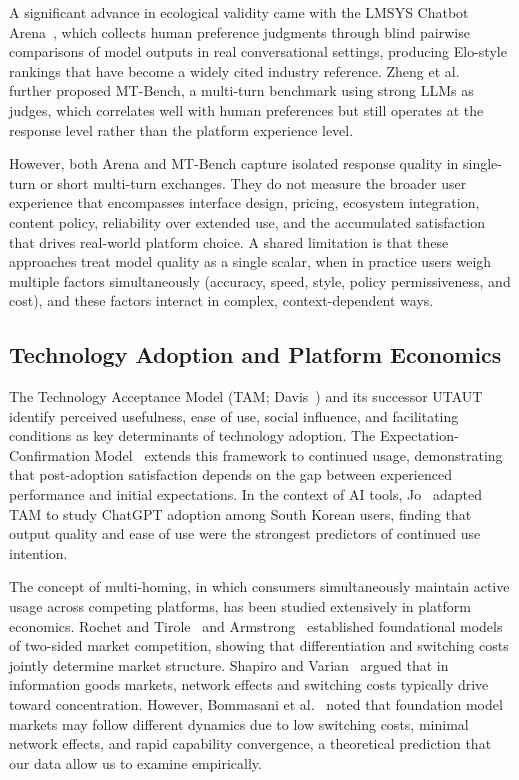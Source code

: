 \documentclass[10pt,twocolumn]{article}
\begin{document}
A significant advance in ecological validity came with the LMSYS Chatbot Arena~\cite{chiang2024}, which collects human preference judgments through blind pairwise comparisons of model outputs in real conversational settings, producing Elo-style rankings that have become a widely cited industry reference. Zheng et al.~\cite{zheng2023} further proposed MT-Bench, a multi-turn benchmark using strong LLMs as judges, which correlates well with human preferences but still operates at the response level rather than the platform experience level.

However, both Arena and MT-Bench capture isolated response quality in single-turn or short multi-turn exchanges. They do not measure the broader user experience that encompasses interface design, pricing, ecosystem integration, content policy, reliability over extended use, and the accumulated satisfaction that drives real-world platform choice. A shared limitation is that these approaches treat model quality as a single scalar, when in practice users weigh multiple factors simultaneously (accuracy, speed, style, policy permissiveness, and cost), and these factors interact in complex, context-dependent ways.

\subsection{Technology Adoption and Platform Economics}

The Technology Acceptance Model (TAM; Davis~\cite{davis1989}) and its successor UTAUT~\cite{venkatesh2003} identify perceived usefulness, ease of use, social influence, and facilitating conditions as key determinants of technology adoption. The Expectation-Confirmation Model~\cite{bhattacherjee2001} extends this framework to continued usage, demonstrating that post-adoption satisfaction depends on the gap between experienced performance and initial expectations. In the context of AI tools, Jo~\cite{jo2024} adapted TAM to study ChatGPT adoption among South Korean users, finding that output quality and ease of use were the strongest predictors of continued use intention.

The concept of multi-homing, in which consumers simultaneously maintain active usage across competing platforms, has been studied extensively in platform economics. Rochet and Tirole~\cite{rochet2003} and Armstrong~\cite{armstrong2006} established foundational models of two-sided market competition, showing that differentiation and switching costs jointly determine market structure. Shapiro and Varian~\cite{shapiro1998} argued that in information goods markets, network effects and switching costs typically drive toward concentration. However, Bommasani et al.~\cite{bommasani2022} noted that foundation model markets may follow different dynamics due to low switching costs, minimal network effects, and rapid capability convergence, a theoretical prediction that our data allow us to examine empirically.
\end{document}
